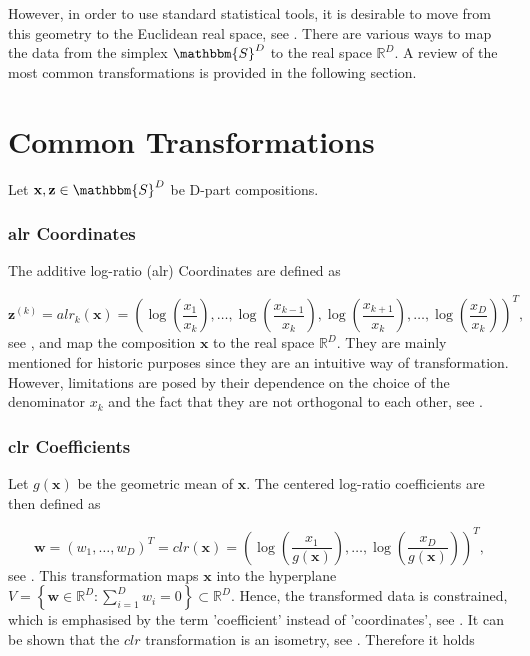 However, in order to use standard statistical tools, it is desirable to move from this geometry to the Euclidean real space, see \textcite{Filzmoser:2020}. There are various ways to map the data from the simplex $\mathbbm{S}^D$ to the real space $\mathbb{R}^D$. A review of the most common transformations is provided in the following section.

\section{Common Transformations}
\label{sec: Common Transformations}

Let $\textbf{x}, \textbf{z} \in \mathbbm{S}^D$ be D-part compositions.
\subsubsection{alr Coordinates}
\label{sec:alr Coordinates}

The additive log-ratio (alr) Coordinates are defined as

\begin{equation}
\textbf{z}^{(k)} = alr_k(\textbf{x}) = \left(\log\left(\frac{x_1}{x_k}\right), \ldots, \log\left(\frac{x_{k-1}}{x_k}\right),\log\left(\frac{x_{k+1}}{x_k}\right),\ldots,\log\left(\frac{x_D}{x_k}\right)\right)^T,
\label{eq:alr Coordinates}
\end{equation}
%
see \textcite{Kynclova:2015}, and map the composition $\textbf{x}$ to the real space $\mathbb{R}^D$. They are mainly mentioned for historic purposes since they are an intuitive way of transformation. However, limitations are posed by their dependence on the choice of the denominator $x_k$ and the fact that they are not orthogonal to each other, see \textcite{Filzmoser:2020}. 

\subsubsection{clr Coefficients}
\label{sec:clr Coefficients}

Let $g(\textbf{x})$ be the geometric mean of $\textbf{x}$. The centered log-ratio coefficients are then defined as

\begin{equation}
\textbf{w} = (w_1,\ldots, w_D)^T = clr(\textbf{x}) = \left(\log\left(\frac{x_1}{g(\textbf{x})}\right),\ldots, \log\left(\frac{x_D}{g(\textbf{x})}\right)\right)^T,
\label{eq:clr Coefficients}
\end{equation}
%
see \textcite{Kynclova:2015}. This transformation maps $\textbf{x}$ into the hyperplane $V = \left\{\textbf{w} \in \mathbb{R}^D: \sum_{i=1}^D w_i=0\right\} \subset \mathbb{R}^D$. Hence, the transformed data is constrained, which is emphasised by the term 'coefficient' instead of 'coordinates', see \textcite{Filzmoser:2020}. It can be shown that the $clr$ transformation is an isometry, see \textcite{Egozcue:2003}. Therefore it holds 

